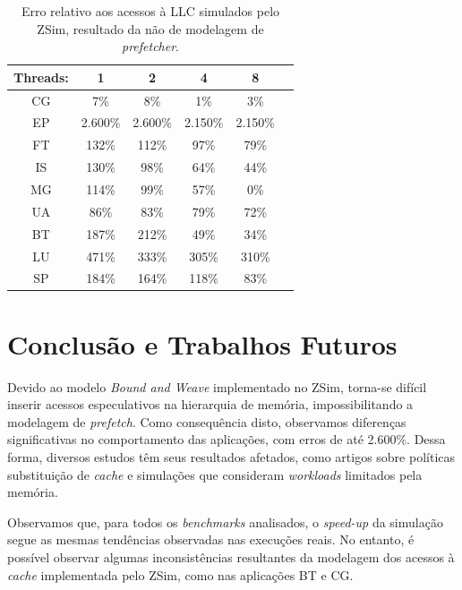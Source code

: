 \documentclass[12pt]{article}
\begin{document}
\begin{table}[t]
    \small\sf\centering %
    \setlength\tabcolsep{6pt} %
    \caption{Erro relativo aos acessos à LLC simulados pelo ZSim, resultado da não de modelagem de \textit{prefetcher}.}
    \label{table:resumo}
    \begin{tabular}{cccccc}
    \toprule
    \textbf{Threads:}  	& \textbf{1}   	& \textbf{2}  	& \textbf{4}   & \textbf{8} 	 \\
    \toprule
    CG  &  7\%    			&  8\%      	& 1\%   			& 3\% 	\\
    EP  &  2.600\% 			&  2.600\%     	& 2.150\%    		& 2.150\%  	\\
    FT  &  132\%   			&  112\%   		& 97\%    			& 79\%  	\\
    IS  &  130\%   			&  98\%     	& 64\%    			& 44\%  	\\
    MG  &  114\%   			&  99\%   		& 57\%    			& 0\%   \\
    UA  &  86\%   			&  83\%     	& 79\%    			& 72\%   \\
    BT  &  187\%   			&  212\%     	& 49\%    			& 34\%  	\\
    LU  &  471\%   			&  333\%     	& 305\%    			& 310\%   \\
    SP  &  184\%   			&  164\%     	& 118\%    			& 83\%   \\
    \bottomrule
    \end{tabular}
\end{table}



\section{Conclusão e Trabalhos Futuros}\label{conclusao}

Devido ao modelo \textit{Bound and Weave} implementado no ZSim, torna-se difícil inserir acessos especulativos na hierarquia de memória, impossibilitando a modelagem de \textit{prefetch}.
Como consequência disto, observamos diferenças significativas no comportamento das aplicações, com erros de até 2.600\%.
Dessa forma, diversos estudos têm seus resultados afetados, como artigos sobre políticas substituição de \textit{cache} e simulações que consideram \textit{workloads} limitados pela memória.

\vspace{-2mm}
Observamos que, para todos os \textit{benchmarks} analisados, o \textit{speed-up} da simulação segue as mesmas tendências observadas nas execuções reais.
No entanto, é possível observar algumas inconsistências resultantes da modelagem dos acessos à \textit{cache} implementada pelo ZSim, como nas aplicações BT e CG. 
\end{document}
